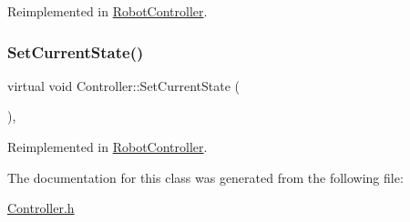 Reimplemented in \mbox{\hyperlink{class_robot_controller_a0eaac3943f32b7bdab6d5af94bf7af36}{Robot\+Controller}}.

\mbox{\label{class_controller_a8cb970ef732138c921434796ad66a75c}} 
\subsubsection{\texorpdfstring{SetCurrentState()}{SetCurrentState()}}
{\footnotesize\ttfamily virtual void Controller\+::\+Set\+Current\+State (\begin{DoxyParamCaption}\item[{std\+::unique\+\_\+ptr$<$ \mbox{\hyperlink{class_robot_state}{Robot\+State}} $>$}]{ }\end{DoxyParamCaption})\hspace{0.3cm}{\ttfamily [inline]}, {\ttfamily [virtual]}}



Reimplemented in \mbox{\hyperlink{class_robot_controller_a71bdb3a9c4bfa5bbdbdedcc3f0d3d8af}{Robot\+Controller}}.



The documentation for this class was generated from the following file\+:\begin{DoxyCompactItemize}
\item 
\mbox{\hyperlink{_controller_8h}{Controller.\+h}}\end{DoxyCompactItemize}
